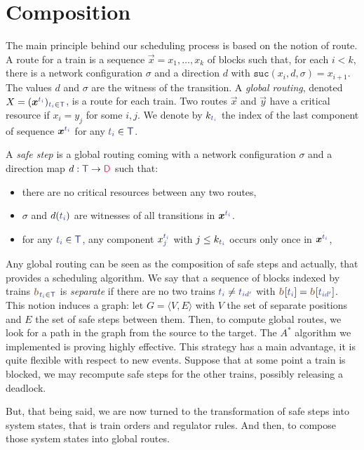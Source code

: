 \documentclass[runningheads]{llncs}
\newcommand{\directions}{\dirFmt{\mathsf{D}}}
\newcommand{\sucblock}{{\mathtt{suc}}}
\newcommand{\dirFmt}[1]{{\color{dircolor} #1}}
\newcommand{\posFmt}[1]{{\color{poscolor}{#1}}}
\newcommand{\bid}[1]{\ensuremath{\posFmt{b_{#1}}}}
\newcommand{\trainFmt}[1]{{\color{traincolor} #1}}
\newcommand{\trains}{{\trainFmt{\mathsf{T}}}}
\newcommand{\tid}[1]{\ensuremath{\trainFmt{t_{#1}}}}
\begin{document}
\section{Composition}
\label{sec:composition}

The main principle behind our scheduling process is based on the notion of route. A route for a train is a sequence $\vec{x} = x_1, \ldots, x_k$ of blocks such that, for each $i < k$, there is a network configuration $\sigma$  and a direction $d$ with $\sucblock(x_i, d, \sigma) = x_{i+1}$.  The values $d$ and $\sigma$ are the witness of the transition. A \emph{global routing}, denoted $X = (\vec{x}^{\tid{i}})_{\tid{i} \in \trains}$, is a route for each train.  Two routes $\vec{x}$ and $\vec{y}$ have a critical resource if  $x_i = y_j$ for some $i,j$. We denote by $k_{\tid{i}}$ the index of the last component of sequence $\vec{x}^\tid{i}$ for any $\tid{i}\in \trains$. 

A \emph{safe step} is a global routing  coming with a network configuration $\sigma$ and a direction map $d: \trains \to \directions$ such that:
\begin{itemize}
\item there are no critical resources between any two routes,
\item $\sigma$ and $d(\tid{i})$ are witnesses of all transitions in $\vec{x}^\tid{i}$. 
\item for any $\tid{i} \in \trains$, any component $x_j^\tid{i}$ with $j \leq k_{\tid{i}}$ occurs only once in $\vec{x}^{\tid{i}}$,
\end{itemize}

Any global routing can be seen as the composition of safe steps and actually, that provides a scheduling algorithm. We say that a sequence of blocks indexed by trains $\vec{\bid{}}_{\tid{i} \in \trains}$ is \emph{separate} if there are no two trains $\tid{i} \neq \tid{id'}$ with $\vec{\bid{}}[\tid{i}] = \vec{\bid{}}[\tid{id'}]$. This notion induces a graph: let $G = \langle V, E\rangle$ with $V$ the set of separate positions and $E$ the set of safe steps between them.  Then, to compute global routes, we look for a path in the graph from the source to the target. The  $A^*$ algorithm we implemented is proving highly effective. This strategy has a main advantage, it is quite flexible with respect to new events. Suppose that at some point a train is blocked, we may recompute safe steps for the other trains, possibly releasing a deadlock. 

 But, that being said, we are now turned to the transformation of safe steps into system states, that is train orders and regulator rules. And then, to compose those system states into global routes. 
\end{document}
